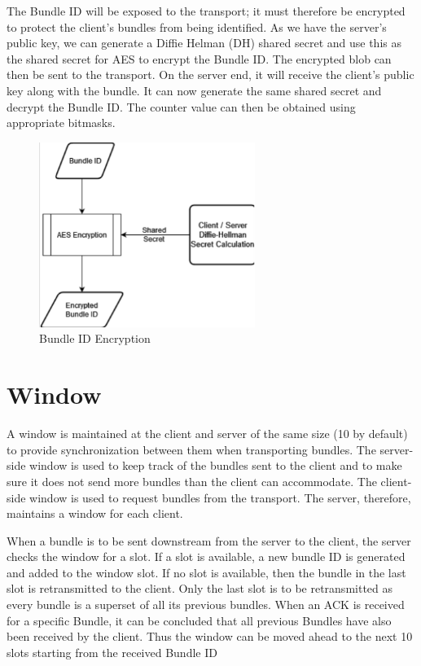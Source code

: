 The Bundle ID will be exposed to the transport; it must therefore be encrypted to protect the client’s bundles from being identified. As we have the server’s public key, we can generate a Diffie Helman (DH) shared secret and use this as the shared secret for AES to encrypt the Bundle ID. The encrypted blob can then be sent to the transport. On the server end, it will receive the client’s public key along with the bundle. It can now generate the same shared secret and decrypt the Bundle ID. The counter value can then be obtained using appropriate bitmasks. 


\begin{figure}[ht!]
\centering
\includegraphics[width= 70mm]{./images/BundleID_Encryption.png}
\caption{Bundle ID Encryption}
\end{figure}

\section{Window}
A window is maintained at the client and server of the same size (10 by default) to provide synchronization between them when transporting bundles. The server-side window is used to keep track of the bundles sent to the client and to make sure it does not send more bundles than the client can accommodate. The client-side window is used to request bundles from the transport. The server, therefore, maintains a window for each client.

When a bundle is to be sent downstream from the server to the client, the server checks the window for a slot. If a slot is available, a new bundle ID is generated and added to the window slot. If no slot is available, then the bundle in the last slot is retransmitted to the client. Only the last slot is to be retransmitted as every bundle is a superset of all its previous bundles. When an ACK is received for a specific Bundle, it can be concluded that all previous Bundles have also been received by the client. Thus the window can be moved ahead to the next 10 slots starting from the received Bundle ID

